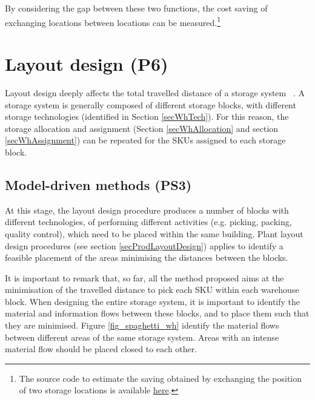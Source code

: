 By considering the gap between these two functions, the cost saving of exchanging locations between locations can be measured.\footnote{The source code to estimate the saving obtained by exchanging the position of two storage locations is available \href{https://github.com/aletuf93/logproj/blob/master/logproj/P6_placementProblem/warehouse_graph_definition.py}{here}.}

\section{Layout design (P6)}
Layout design deeply affects the total travelled distance of a storage system ~\cite{Jaimes2012, Le-Duc1999, Pliskin1982, Tutam2015, Zhang2002}. A storage system is generally composed of different storage blocks, with different storage technologies (identified in Section \ref{secWhTech}). For this reason, the storage allocation and assignment (Section \ref{secWhAllocation} and section \ref{secWhAssignment}) can be repeated for the SKUs assigned to each storage block.

\subsection{Model-driven methods (PS3)}
At this stage, the layout design procedure produces a number of blocks with different technologies, of performing different activities (e.g. picking, packing, quality control), which need to be placed within the same building. Plant layout design procedures (see section \ref{secProdLayoutDesign}) applies to identify a feasible placement of the areas minimising the distances between the blocks.\par

It is important to remark that, so far, all the method proposed aims at the minimisation of the travelled distance to pick each SKU within each warehouse block. When designing the entire storage system, it is important to identify the material and information flows between these blocks, and to place them such that they are minimised. Figure \ref{fig_spaghetti_wh} identify the material flows between different areas of the same storage system. Areas with an intense material flow should be placed closed to each other.

